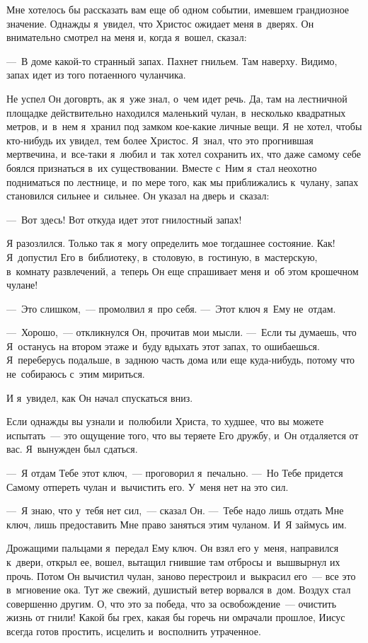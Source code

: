 \documentclass[12pt,article,a4paper,fittopage]{ncc}
\begin{document}
\begin{multicols}{2}
Мне хотелось бы рассказать вам еще об одном событии, имевшем грандиозное значение. Однажды я~увидел, что Христос ожидает меня в~дверях. Он внимательно смотрел на меня и, когда я~вошел, сказал: 

---~В доме какой-то странный запах. Пахнет гнильем. Там наверху. Видимо, запах идет из того потаенного чуланчика. 

Не успел Он договрть, ак я~уже знал, о~чем идет речь. Да, там на лестничной площадке действительно находился маленький чулан, в~несколько квадратных метров, и~в~нем я~хранил под замком кое-какие личные вещи. Я~не хотел, чтобы кто-нибудь их увидел, тем более Христос. Я~знал, что это прогнившая мертвечина, и~все-таки я~любил и~так хотел сохранить их, что даже самому себе боялся признаться в~их существовании. Вместе с~Ним я~стал неохотно подниматься по лестнице, и~по мере того, как мы приближались к~чулану, запах становился сильнее и~сильнее. Он указал на дверь и~сказал:

---~Вот здесь! Вот откуда идет этот гнилостный запах!

Я разозлился. Только так я~могу определить мое тогдашнее состояние. Как! Я~допустил Его в~библиотеку, в~столовую, в~гостиную, в~мастерскую, в~комнату развлечений, а~теперь Он еще спрашивает меня и~об этом крошечном чулане! 

---~Это слишком,~--- промолвил я~про себя. ---~Этот ключ я~Ему не~отдам.

---~Хорошо,~--- откликнулся Он, прочитав мои мысли. ---~Если ты думаешь, что Я~останусь на втором этаже и~буду вдыхать этот запах, то ошибаешься. Я~переберусь подальше, в~заднюю часть дома или еще куда-нибудь, потому что не~собираюсь с~этим мириться. 

И я~увидел, как Он начал спускаться вниз.

Если однажды вы узнали и~полюбили Христа, то худшее, что вы можете испытать~--- это ощущение того, что вы теряете Его дружбу, и~Он отдаляется от вас. Я~вынужден был сдаться. 

---~Я отдам Тебе этот ключ,~--- проговорил я~печально. ---~Но Тебе придется Самому отпереть чулан и~вычистить его. У~меня нет на это сил.

---~Я знаю, что у~тебя нет сил,~--- сказал Он. ---~Тебе надо лишь отдать Мне ключ, лишь предоставить Мне право заняться этим чуланом. И~Я займусь им. 

Дрожащими пальцами я~передал Ему ключ. Он взял его у~меня, направился к~двери, открыл ее, вошел, вытащил гнившие там отбросы и~вышвырнул их прочь. Потом Он вычистил чулан, заново перестроил и~выкрасил его~--- все это в~мгновение ока. Тут же свежий, душистый ветер ворвался в~дом. Воздух стал совершенно другим. О, что это за победа, что за освобождение~--- очистить жизнь от гнили! Какой бы грех, какая бы горечь ни омрачали прошлое, Иисус всегда готов простить, исцелить и~восполнить утраченное.




\end{multicols}
\end{document}
